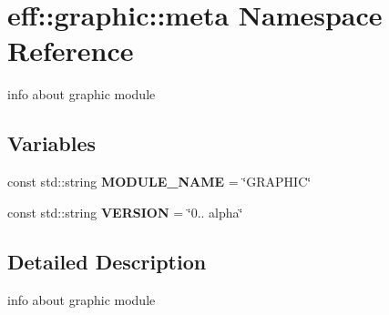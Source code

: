 \hypertarget{namespaceeff_1_1graphic_1_1meta}{}\section{eff\+:\+:graphic\+:\+:meta Namespace Reference}
\label{namespaceeff_1_1graphic_1_1meta}


info about graphic module  


\subsection*{Variables}
\begin{DoxyCompactItemize}
\item 
\mbox{\label{namespaceeff_1_1graphic_1_1meta_a94b9ca876c17a3113bdb3cd117ba717b}} 
const std\+::string {\bfseries M\+O\+D\+U\+L\+E\+\_\+\+N\+A\+ME} = \char`\"{}G\+R\+A\+P\+H\+IC\char`\"{}
\item 
\mbox{\label{namespaceeff_1_1graphic_1_1meta_a31cf267b5ebd058c178f9f45364c4d36}} 
const std\+::string {\bfseries V\+E\+R\+S\+I\+ON} = \char`\"{}0.. alpha\char`\"{}
\end{DoxyCompactItemize}


\subsection{Detailed Description}
info about graphic module 